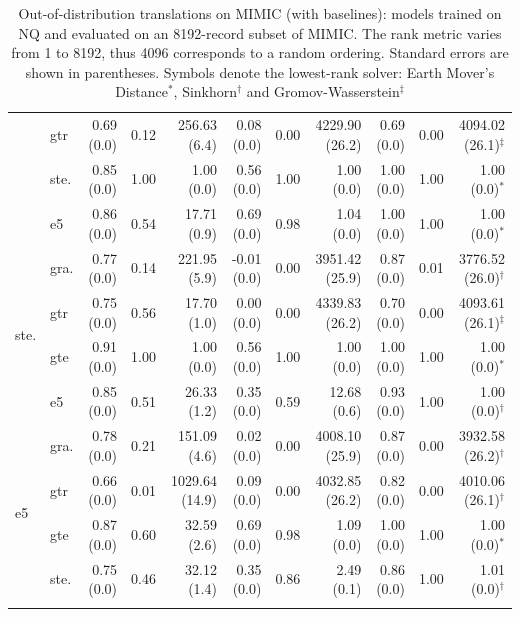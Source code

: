 \begin{table}[!ht]
\begin{tabular}{llrrrrrrrrr}
        & gtr & 0.69 {\tiny (0.0)} & 0.12 & 256.63 {\tiny (6.4)} & 0.08 {\tiny (0.0)} & 0.00 & 4229.90 {\tiny (26.2)} & 0.69 {\tiny (0.0)} & 0.00 & 4094.02 {\tiny (26.1)}$^\ddagger$ \\
        & ste. & 0.85 {\tiny (0.0)} & 1.00 & 1.00 {\tiny (0.0)} & 0.56 {\tiny (0.0)} & 1.00 & 1.00 {\tiny (0.0)} & 1.00 {\tiny (0.0)} & 1.00 & 1.00 {\tiny (0.0)}$^*$ \\
        & e5 & 0.86 {\tiny (0.0)} & 0.54 & 17.71 {\tiny (0.9)} & 0.69 {\tiny (0.0)} & 0.98 & 1.04 {\tiny (0.0)} & 1.00 {\tiny (0.0)} & 1.00 & 1.00 {\tiny (0.0)}$^*$ \\
        \midrule
        \multirow{4}{*}{ste.} & gra. & 0.77 {\tiny (0.0)} & 0.14 & 221.95 {\tiny (5.9)} & -0.01 {\tiny (0.0)} & 0.00 & 3951.42 {\tiny (25.9)} & 0.87 {\tiny (0.0)} & 0.01 & 3776.52 {\tiny (26.0)}$^\dagger$ \\
        & gtr & 0.75 {\tiny (0.0)} & 0.56 & 17.70 {\tiny (1.0)} & 0.00 {\tiny (0.0)} & 0.00 & 4339.83 {\tiny (26.2)} & 0.70 {\tiny (0.0)} & 0.00 & 4093.61 {\tiny (26.1)}$^\ddagger$ \\
        & gte & 0.91 {\tiny (0.0)} & 1.00 & 1.00 {\tiny (0.0)} & 0.56 {\tiny (0.0)} & 1.00 & 1.00 {\tiny (0.0)} & 1.00 {\tiny (0.0)} & 1.00 & 1.00 {\tiny (0.0)}$^*$ \\
        & e5 & 0.85 {\tiny (0.0)} & 0.51 & 26.33 {\tiny (1.2)} & 0.35 {\tiny (0.0)} & 0.59 & 12.68 {\tiny (0.6)} & 0.93 {\tiny (0.0)} & 1.00 & 1.00 {\tiny (0.0)}$^\dagger$ \\
        \midrule
        \multirow{4}{*}{e5} & gra. & 0.78 {\tiny (0.0)} & 0.21 & 151.09 {\tiny (4.6)} & 0.02 {\tiny (0.0)} & 0.00 & 4008.10 {\tiny (25.9)} & 0.87 {\tiny (0.0)} & 0.00 & 3932.58 {\tiny (26.2)}$^\dagger$ \\
        & gtr & 0.66 {\tiny (0.0)} & 0.01 & 1029.64 {\tiny (14.9)} & 0.09 {\tiny (0.0)} & 0.00 & 4032.85 {\tiny (26.2)} & 0.82 {\tiny (0.0)} & 0.00 & 4010.06 {\tiny (26.1)}$^\dagger$ \\
        & gte & 0.87 {\tiny (0.0)} & 0.60 & 32.59 {\tiny (2.6)} & 0.69 {\tiny (0.0)} & 0.98 & 1.09 {\tiny (0.0)} & 1.00 {\tiny (0.0)} & 1.00 & 1.00 {\tiny (0.0)}$^*$ \\
        & ste. & 0.75 {\tiny (0.0)} & 0.46 & 32.12 {\tiny (1.4)} & 0.35 {\tiny (0.0)} & 0.86 & 2.49 {\tiny (0.1)} & 0.86 {\tiny (0.0)} & 1.00 & 1.01 {\tiny (0.0)}$^\dagger$ \\
        \bottomrule\\[-1.6ex]
    \end{tabular}
    \caption{Out-of-distribution translations on MIMIC (with baselines): \atk{} models trained on NQ and evaluated on an 8192-record subset of MIMIC. The rank metric varies from 1 to 8192, thus 4096 corresponds to a random ordering. Standard errors are shown in parentheses. Symbols denote the lowest-rank solver: Earth Mover's Distance$^*$, Sinkhorn$^\dagger$ and Gromov-Wasserstein$^\ddagger$}
    \label{tab:embedding_comparison_ood_mimic}
\end{table}

